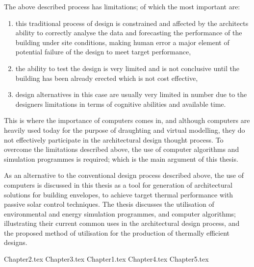 The above described process has limitations; of which the most important are:
\begin{enumerate}
	\item this traditional process of design is constrained and affected by the architects ability to correctly analyse the data and forecasting the performance of the building under site conditions, making human error a major element of potential failure of the design to meet target performance, 
	\item the ability to test the design is very limited and is not conclusive until the building has been already erected which is not cost effective, 
	\item design alternatives in this case are usually very limited in number due to the designers limitations in terms of cognitive abilities and available time.
\end{enumerate}

This is where the importance of computers comes in, and although computers are heavily used today for the purpose of draughting and virtual modelling, they do not effectively participate in the architectural design thought process. To overcome the limitations described above, the use of computer algorithms and simulation programmes is required; which is the main argument of this thesis.

As an alternative to the conventional design process described above, the use of computers is discussed in this thesis as a tool for generation of architectural solutions for building envelopes, to achieve target thermal performance with passive solar control techniques. The thesis discusses the utilisation of environmental and energy simulation programmes, and computer algorithms; illustrating their current common uses in the architectural design process, and the proposed method of utilisation for the production of thermally efficient designs.

\mainmatter

{Chapter2.tex}
{Chapter3.tex}
{Chapter1.tex}
{Chapter4.tex}
{Chapter5.tex}




